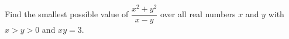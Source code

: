 Find the smallest possible value of $\dfrac{x^2+y^2}{x-y}$ over all real numbers $x$ and $y$ with $x>y>0$ and $xy=3$.
